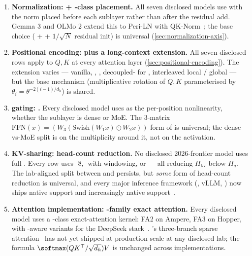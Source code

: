 \begin{enumerate}
\item \textbf{Normalization:  + -class placement.} All
seven disclosed models use  with the norm placed before each
sublayer rather than after the residual add. Gemma 3 and OLMo 2
extend this to Peri-LN with QK-Norm~\citep{gemma3,olmo2}; the base
choice ( +  + $1/\sqrt{N}$ residual init) is universal
(\cref{sec:normalization-axis}).

\item \textbf{Positional encoding:  plus a long-context
extension.} All seven disclosed rows apply  to $Q, K$ at every
attention layer (\cref{sec:positional-encoding}). The extension varies ---
vanilla, , , decoupled- for , interleaved
local / global --- but the base mechanism (multiplicative rotation
of $Q, K$ parameterised by $\theta_i = \theta^{-2(i-1)/d_h}$) is
shared.

\item \textbf{ gating: .} Every disclosed model uses
 as the per-position  nonlinearity, whether the sublayer
is dense or MoE. The 3-matrix
$\mathrm{FFN}(x) = (W_3 (\mathrm{Swish}(W_1 x) \odot W_2 x))$
form of \citet[Eq.~6]{shazeer2020} is universal; the dense-vs-MoE
split is on the multiplicity around it, not on the activation.

\item \textbf{KV-sharing: head-count reduction.} No disclosed
2026-frontier model uses full . Every row uses -8,
-with-windowing, or  --- all reducing $H_{\mathrm{kv}}$ below
$H_q$. The lab-aligned split between  and  persists, but
\emph{some} form of head-count reduction is universal, and every
major inference framework (, vLLM, ) now ships
native  support and increasingly native
 support~\citep{kwon2023,dao2023}.

\item \textbf{Attention implementation: -family exact
attention.} Every disclosed model uses a -class
exact-attention kernel: FA2 on Ampere, FA3 on Hopper, with
-aware variants for the DeepSeek
stack~\citep{dao2023,shah2024,deepseek-v3}. 's three-branch
sparse attention~\citep{yuan2025} has not yet shipped at production
scale at any disclosed lab; the formula
$\softmax(QK^\top/\sqrt{d_h})V$ is unchanged across implementations.
\end{enumerate}

